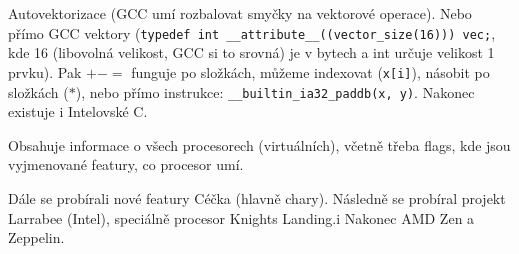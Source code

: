 \documentclass[12pt]{article}                   %
\begin{document}
        \begin{definice}
            Autovektorizace (GCC umí rozbalovat smyčky na vektorové operace). Nebo přímo GCC vektory (\verb|typedef int __attribute__((vector_size(16))) vec;|, kde 16 (libovolná velikost, GCC si to srovná) je v bytech a int určuje velikost 1 prvku). Pak $+-=$ funguje po složkách, můžeme indexovat (\verb|x[i]|), násobit po složkách ($*$), nebo přímo instrukce: \verb|__builtin_ia32_paddb(x, y)|. Nakonec existuje i Intelovské C.
        \end{definice}

        \begin{definice}
            Obsahuje informace o všech procesorech (virtuálních), včetně třeba flags, kde jsou vyjmenované featury, co procesor umí.
        \end{definice}


        Dále se probírali nové featury Céčka (hlavně chary). Následně se probíral projekt Larrabee (Intel), speciálně procesor Knights Landing.i Nakonec AMD Zen a Zeppelin.
\end{document}
